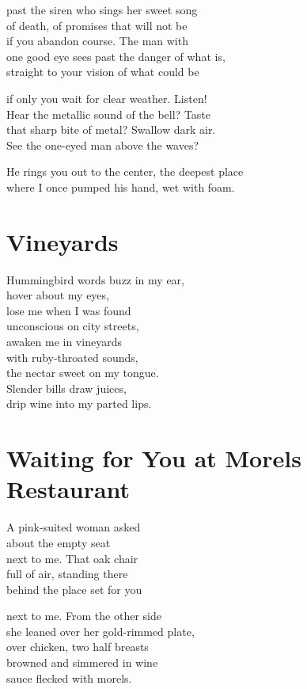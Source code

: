 \documentclass[twoside,10pt]{book}
\begin{document}
past the siren who sings her sweet song\\
of death, of promises that will not be\\
if you abandon course. The man with\\
one good eye sees past the danger of what is,\\
straight to your vision of what could be

if only you wait for clear weather. Listen!\\
Hear the metallic sound of the bell? Taste\\
that sharp bite of metal? Swallow dark air.\\
See the one-eyed man above the waves?

He rings you out to the center, the deepest place\\
where I once pumped his hand, wet with foam.


\clearpage
\section{Vineyards}

Hummingbird words buzz in my ear,\\
hover about my eyes,\\
lose me when I was found\\
unconscious on city streets,\\
awaken me in vineyards\\
with ruby-throated sounds,\\
the nectar sweet on my tongue.\\
Slender bills draw juices,\\
drip wine into my parted lips.


\clearpage
\section{Waiting for You at Morels Restaurant}

A pink-suited woman asked\\
about the empty seat\\
next to me. That oak chair\\
full of air, standing there\\
behind the place set for you

next to me. From the other side\\
she leaned over her gold-rimmed plate,\\
over chicken, two half breasts\\
browned and simmered in wine\\
sauce flecked with morels.
\end{document}

